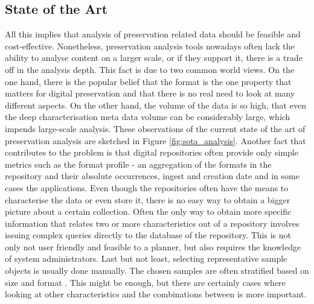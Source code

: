 \subsection{State of the Art}
All this implies that analysis of preservation related data should be feasible and cost-effective. Nonetheless, preservation analysis tools nowadays often lack the ability to analyse content on a larger scale, or if they support it, there is a trade off in the analysis depth. This fact is due to two common world views. On the one hand, there is the popular belief that the format is the one property that matters for digital preservation \cite{citeulike:8904907} and that there is no real need to look at many different aspects. On the other hand, the volume of the data is so high, that even the deep characterisation meta data volume can be considerably large, which impends large-scale analysis. These observations of the current state of the art of preservation analysis are sketched in Figure \ref{fig:sota_analysis}.
\newline\indent Another fact that contributes to the problem is that digital repositories often provide only simple metrics such as the format profile - an aggregation of the formats in the repository and their absolute occurrences, ingest and creation date and in some cases the applications. Even though the repositories often have the means to characterise the data or even store it, there is no easy way to obtain a bigger picture about a certain collection.
Often the only way to obtain more specific information that relates two or more characteristics out of a repository involves
issuing complex queries directly to the database of the repository. This is not only not user friendly and feasible to a planner, but also requires the knowledge of system administrators.
\newline\indent Last but not least, selecting representative sample objects is usually done manually. The chosen samples are often stratified based on size and format \cite{journals/dlib/KulovitsRKBBS09}. This might be enough, but there are certainly cases where looking at other characteristics and the combinations between is more important.

